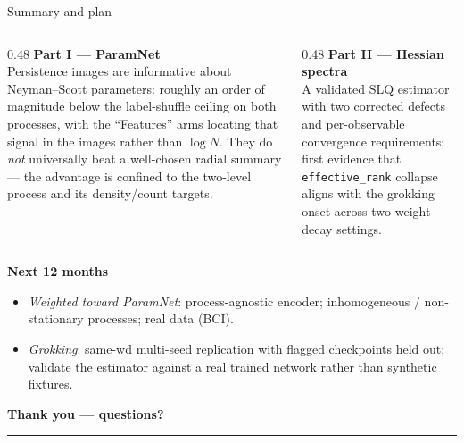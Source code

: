 \documentclass[aspectratio=169,10pt]{beamer}
\begin{document}
\begin{frame}{Summary and plan}
\begin{columns}[T,onlytextwidth]
\begin{column}{0.48\textwidth}
\textbf{Part I --- ParamNet}\\[3pt]
{\footnotesize
Persistence images are informative about Neyman--Scott parameters: roughly an
order of magnitude below the label-shuffle ceiling on both processes, with the
``Features'' arms locating that signal in the images rather than $\log N$.
They do \emph{not} universally beat a well-chosen radial summary --- the
advantage is confined to the two-level process and its density/count targets.}
\end{column}
\begin{column}{0.48\textwidth}
\textbf{Part II --- Hessian spectra}\\[3pt]
{\footnotesize
A validated SLQ estimator with two corrected defects and per-observable
convergence requirements; first evidence that \texttt{effective\_rank} collapse
aligns with the grokking onset across two weight-decay settings.}
\end{column}
\end{columns}
\vspace{8pt}
\textbf{Next 12 months}
\begin{itemize}\footnotesize
  \item \emph{Weighted toward ParamNet}: process-agnostic encoder;
        inhomogeneous / non-stationary processes; real data (BCI).
  \item \emph{Grokking}: same-wd multi-seed replication with flagged checkpoints
        held out; validate the estimator against a real trained network rather
        than synthetic fixtures.
\end{itemize}
\end{frame}

\begin{frame}[plain]
\centering\vfill
{\Large\bfseries Thank you --- questions?}\\[0.35cm]
{\color{cred}\rule{4cm}{1.2pt}}
\vfill
\end{frame}

\appendix
\end{document}
